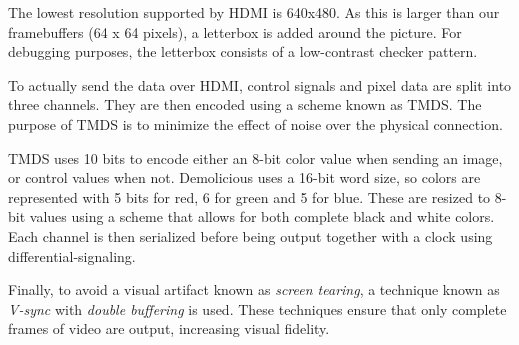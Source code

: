 \documentclass[../main/report.tex]{subfiles}
\begin{document}
The lowest resolution supported by HDMI is 640x480.
As this is larger than our framebuffers (64 x 64 pixels), a letterbox is added around the picture.
For debugging purposes, the letterbox consists of a low-contrast checker pattern.

To actually send the data over HDMI, control signals and pixel data are split into three channels.
They are then encoded using a scheme known as TMDS.
The purpose of TMDS is to minimize the effect of noise over the physical connection.

TMDS uses 10 bits to encode either an 8-bit color value when sending an image, or control values when not.
Demolicious uses a 16-bit word size, so colors are represented with 5 bits for red, 6 for green and 5 for blue.
These are resized to 8-bit values using a scheme that allows for both complete black and white colors.
Each channel is then serialized before being output together with a clock using differential-signaling.

Finally, to avoid a visual artifact known as \emph{screen tearing}, a technique known as \emph{V-sync} with \emph{double buffering} is used.
These techniques ensure that only complete frames of video are output, increasing visual fidelity.
\end{document}
